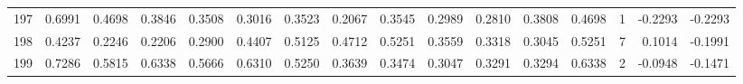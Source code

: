 \begin{tabular}{lrrrrrrrrrrrrrrr}
197 &      0.6991 &  0.4698 &  0.3846 &  0.3508 &  0.3016 &  0.3523 &  0.2067 &  0.3545 &  0.2989 &  0.2810 &   0.3808 &     0.4698 &      1 &                   -0.2293 &                    -0.2293 \\
198 &      0.4237 &  0.2246 &  0.2206 &  0.2900 &  0.4407 &  0.5125 &  0.4712 &  0.5251 &  0.3559 &  0.3318 &   0.3045 &     0.5251 &      7 &                    0.1014 &                    -0.1991 \\
199 &      0.7286 &  0.5815 &  0.6338 &  0.5666 &  0.6310 &  0.5250 &  0.3639 &  0.3474 &  0.3047 &  0.3291 &   0.3294 &     0.6338 &      2 &                   -0.0948 &                    -0.1471 \\
\bottomrule
\end{tabular}
